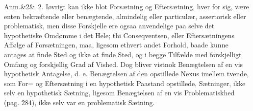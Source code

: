 \documentclass[12pt]{book}
\def\sperr#1{#1}%
\def\textit#1{#1}%
\def\emph#1{#1}%
\newcommand{\sperr}[1]{\textls[180]{#1}}
\newcommand{\anm}[1]{%
  \par\vspace{0.5\baselineskip}%
  \noindent\hspace{\parindent}\sperr{Anm.}\ifx&#1&\else~\textit{#1}.\fi
  \enspace\ignorespaces
}
\newcommand{\opage}[1]{\marginnote{\footnotesize\textit{[#1]}}}
\begin{document}
\opage{289} %
\anm{2} Iøvrigt kan ikke blot Forsætning og Eftersætning, hver for sig, være
enten bekræftende eller benægtende, almindelig eller particulær, assertorisk
eller problematisk, men disse Forskjelle ere ogsaa anvendelige paa selve det
hypothetiske Omdømme i det Hele; thi Conseqventsen, eller Eftersætningens
Affølge af Forsætningen, maa, ligesom ethvert andet Forhold, baade kunne antages
at finde Sted og ikke at finde Sted, og i begge Tilfælde med forskjelligt Omfang
og forskjellig Grad af Vished. Dog bliver vistnok Benægtelsen af en vis
hypothetisk Antagelse, d. e. Benægtelsen af den opstillede \emph{Nexus} imellem
tvende, som For= og Eftersætning i en hypothetisk Paastand opstillede,
Sætninger, ikke selv en hypothetisk Sætning, ligesom Benægtelsen af en vis
Problematiskhed (pag. 284), ikke selv var en problematisk Sætning.
\end{document}
